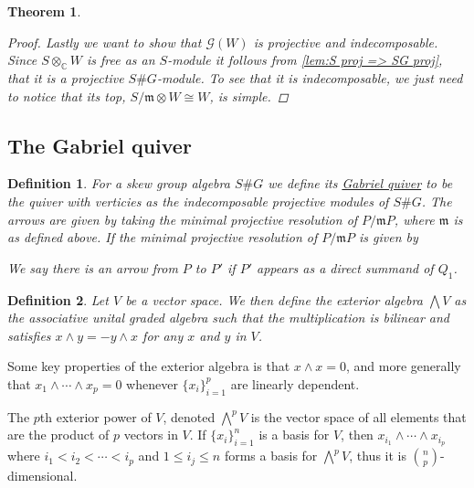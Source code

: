 \documentclass[11pt, a4paper, english]{article}
\numberwithin{prop}{section}
\numberwithin{lemma}{section}
\newtheorem{theorem}{Theorem}
\numberwithin{theorem}{section}
\newtheorem{defin}{Definition}
\numberwithin{defin}{section}
\numberwithin{example}{section}
\newcommand{\C}{\mathbb{C}}
\begin{document}
\begin{theorem}
\begin{proof}
Lastly we want to show that $\mathcal{G}(W)$ is projective and indecomposable. Since $S \otimes_\C W$ is free as an $S$-module it follows from \cref{lem:S proj => SG proj}, that it is a projective $S\#G$-module. To see that it is indecomposable, we just need to notice that its top, $S/\mathfrak{m} \otimes W \cong W$, is simple.
\end{proof}
\fi

\end{theorem}

\subsection{The Gabriel quiver}

\begin{defin}
For a skew group algebra $S\#G$ we define its \underline{Gabriel quiver} to be the quiver with verticies as the indecomposable projective modules of $S\#G$. The arrows are given by taking the minimal projective resolution of $P/\mathfrak{m}P$, where $\mathfrak{m}$ is as defined above. If the minimal projective resolution of $P/\mathfrak{m}P$ is given by
\begin{center}
\end{center}
We say there is an arrow from $P$ to $P'$ if $P'$ appears as a direct summand of $Q_1$.
\end{defin}

\begin{defin}
Let $V$ be a vector space. We then define the exterior algebra $\bigwedge V$ as the associative unital graded algebra such that the multiplication is bilinear and satisfies $x \wedge y = -y \wedge x$ for any $x$ and $y$ in $V$. 
\end{defin}
Some key properties of the exterior algebra is that $x \wedge x = 0$, and more generally that $x_1 \wedge \cdots \wedge x_p = 0$ whenever $\{x_i\}_{i=1}^p$ are linearly dependent.

The $p$th exterior power of $V$, denoted $\bigwedge\limits^p V$ is the vector space of all elements that are the product of $p$ vectors in $V$. If $\{ x_i \}_{i=1}^n$ is a basis for $V$, then $x_{i_1} \wedge \cdots \wedge x_{i_p}$ where $i_1 < i_2 < \cdots < i_p$ and $1 \leq i_j \leq n$ forms a basis for $\bigwedge\limits^p V$, thus it is ${n \choose p}$-dimensional.  
\end{document}
